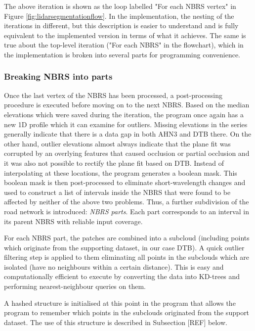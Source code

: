 The above iteration is shown as the loop labelled "For each NBRS vertex" in Figure \ref{fig:lidarsegmentationflow}. In the implementation, the nesting of the iterations in different, but this description is easier to understand and is fully equivalent to the implemented version in terms of what it achieves. The same is true about the top-level iteration ("For each NBRS" in the flowchart), which in the implementation is broken into several parts for programming convenience.

\subsubsection{Breaking NBRS into parts}

Once the last vertex of the NBRS has been processed, a post-processing procedure is executed before moving on to the next NBRS. Based on the median elevations which were saved during the iteration, the program once again has a new 1D profile which it can examine for outliers. Missing elevations in the series generally indicate that there is a data gap in both AHN3 and DTB there. On the other hand, outlier elevations almost always indicate that the plane fit was corrupted by an overlying features that caused occlusion or partial occlusion and it was also not possible to rectify the plane fit based on DTB. Instead of interpolating at these locations, the program generates a boolean mask. This boolean mask is then post-processed to eliminate short-wavelength changes and used to construct a list of intervals inside the NBRS that were found to be affected by neither of the above two problems. Thus, a further subdivision of the road network is introduced: \textit{NBRS parts}. Each part corresponds to an interval in its parent NBRS with reliable input coverage.

For each NBRS part, the patches are combined into a subcloud (including points which originate from the supporting dataset, in our case DTB). A quick outlier filtering step is applied to them eliminating all points in the subclouds which are isolated (have no neighbours within a certain distance). This is easy and computationally efficient to execute by converting the data into KD-trees and performing nearest-neighbour queries on them.

A hashed structure is initialised at this point in the program that allows the program to remember which points in the subclouds originated from the support dataset. The use of this structure is described in Subsection [REF] below.


